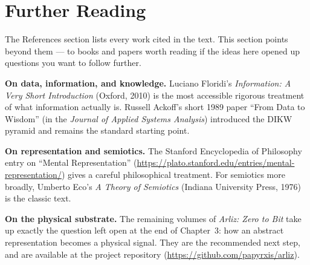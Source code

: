\chapter*{Further Reading}

The References section lists every work cited in the text.
This section points beyond them --- to books and papers worth
reading if the ideas here opened up questions you want to
follow further.

\medskip

\textbf{On data, information, and knowledge.}
Luciano Floridi's \textit{Information: A Very Short Introduction}
(Oxford, 2010) is the most accessible rigorous treatment of what
information actually is.
Russell Ackoff's short 1989 paper ``From Data to Wisdom'' (in the
\textit{Journal of Applied Systems Analysis}) introduced the DIKW
pyramid and remains the standard starting point.

\medskip

\textbf{On representation and semiotics.}
The Stanford Encyclopedia of Philosophy entry on ``Mental
Representation'' (\url{https://plato.stanford.edu/entries/mental-representation/})
gives a careful philosophical treatment.
For semiotics more broadly, Umberto Eco's \textit{A Theory of
Semiotics} (Indiana University Press, 1976) is the classic text.

\medskip

\textbf{On the physical substrate.}
The remaining volumes of \textit{Arliz: Zero to Bit} take up exactly
the question left open at the end of Chapter~3: how an abstract
representation becomes a physical signal. They are the recommended
next step, and are available at the project repository
(\url{https://github.com/papyrxis/arliz}).
